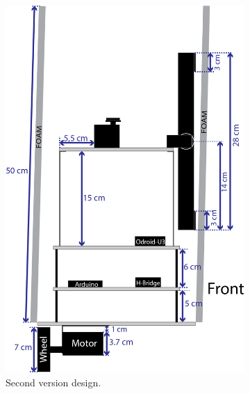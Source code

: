 \begin{figure}
\begin{subfigure}[c]{0.3\textwidth}
	\includegraphics[width=\textwidth]{./Images/upperThirdD.png}
	\caption{Second version design.}
	\label{fig:triskar-second-design}
	\end{subfigure}
	\begin{subfigure}[c]{0.3\textwidth}
	\centering

\end{subfigure}
\end{figure}
